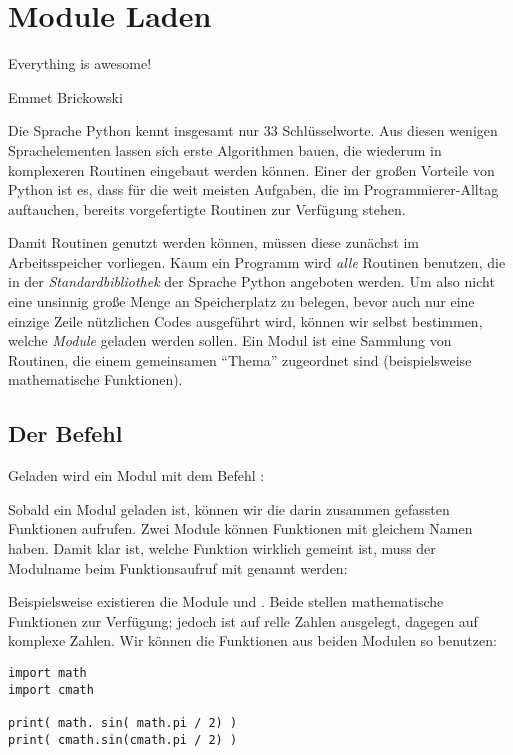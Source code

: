 \chapter{Module Laden}
\epigraph{
	Everything is awesome!
}{Emmet Brickowski}

Die Sprache Python kennt insgesamt nur 33 Schlüsselworte. Aus diesen wenigen Sprachelementen lassen sich erste Algorithmen bauen, die wiederum in komplexeren Routinen eingebaut werden können. Einer der großen Vorteile von Python ist es, dass für die weit meisten Aufgaben, die im Programmierer-Alltag auftauchen, bereits vorgefertigte Routinen zur Verfügung stehen.

Damit Routinen genutzt werden können, müssen diese zunächst im Arbeitsspeicher vorliegen. Kaum ein Programm wird \emph{alle} Routinen benutzen, die in der \emph{Standardbibliothek} der Sprache Python angeboten werden. Um also nicht eine unsinnig große Menge an Speicherplatz zu belegen, bevor auch nur eine einzige Zeile nützlichen Codes ausgeführt wird, können wir selbst bestimmen, welche \emph{Module} geladen werden sollen. Ein Modul ist eine Sammlung von Routinen, die einem gemeinsamen \enquote{Thema} zugeordnet sind (beispielsweise mathematische Funktionen).

\section{Der Befehl }
Geladen wird ein Modul mit dem Befehl :
\begin{codebox}[Syntax]
\end{codebox}

Sobald ein Modul geladen ist, können wir die darin zusammen gefassten Funktionen aufrufen. Zwei Module können Funktionen mit gleichem Namen haben. Damit klar ist, welche Funktion wirklich gemeint ist, muss der Modulname beim Funktionsaufruf mit genannt werden:

\begin{codebox}[Syntax]
\end{codebox}

Beispielsweise existieren die Module  und . Beide stellen mathematische Funktionen zur Verfügung; jedoch ist  auf relle Zahlen ausgelegt,  dagegen auf komplexe Zahlen. Wir können die Funktionen aus beiden Modulen so benutzen:

\begin{codebox}
\begin{verbatim}
import math
import cmath

print( math. sin( math.pi / 2) )
print( cmath.sin(cmath.pi / 2) )
\end{verbatim}
\end{codebox}

